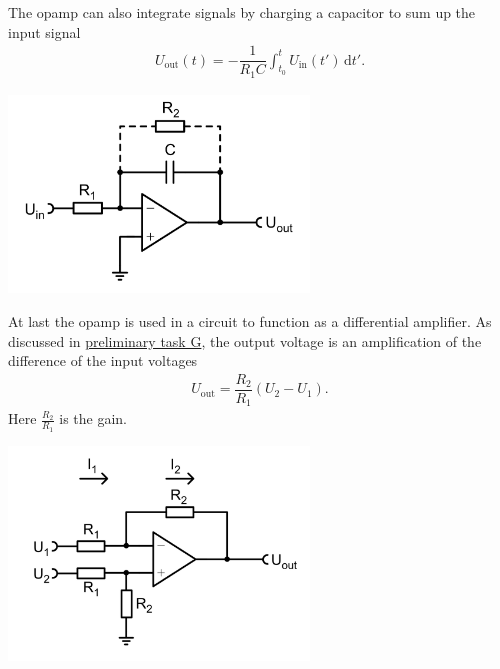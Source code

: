 \documentclass[a4paper,10pt]{article}
\newcommand{\td}{\,\text{d}}
\newenvironment{Figure}
        {\par\medskip\noindent\minipage{\linewidth}}
        {\endminipage\par\medskip}
\numberwithin{equation}{section}
\begin{document}
\begin{multicols}{2}
\begin{Figure}
        \end{Figure}
        \noindent The opamp can also integrate signals by charging a capacitor to sum up the input signal
        \begin{align} 
                U_\text{out}\left(t\right)=-\dfrac{1}{R_1C}\int_{t_0}^{t}U_\text{in}\left(t'\right)\td t'
        .\end{align} 
        \begin{Figure}
                \centering
                \includegraphics[width=0.6\textwidth]{integrator.png}
        \end{Figure}
        \noindent At last the opamp is used in a circuit to function as a differential amplifier.
        As discussed in \hyperref[pre:G]{preliminary task G}, the output voltage is an amplification of the difference of the input voltages
        \begin{align} 
                U_\text{out}=\dfrac{R_2}{R_1}\left(U_2-U_1\right)
        .\end{align} 
        Here $\tfrac{R_2}{R_1}$ is the gain.
        \begin{Figure}
                \centering
                \includegraphics[width=0.6\textwidth]{differential_amp.png}

\end{Figure}
\end{multicols}
\end{document}
